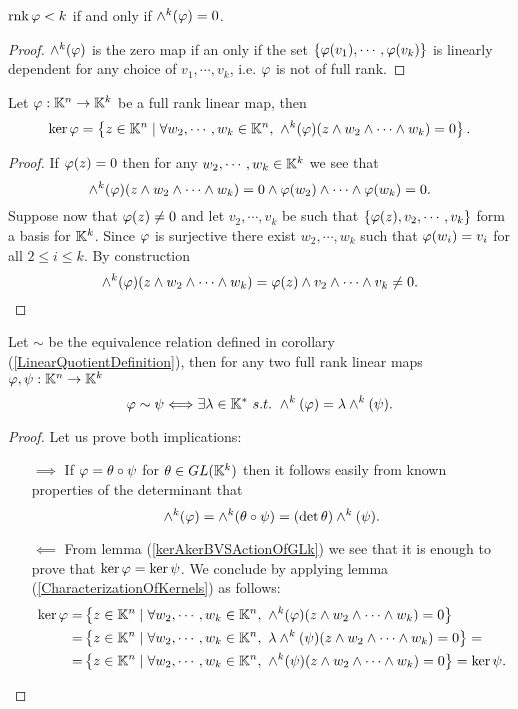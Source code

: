 \begin{remark}\label{WhenPluckerMapIsZero}
$\mathrm{rnk}\, \varphi<k$ if and only if $\wedge^k(\varphi)=0$.
\end{remark}
\begin{proof}
$\wedge^k(\varphi)$ is the zero map if an only if the set $\left\{{\varphi(v_1),\cdots, \varphi(v_k)}\right\}$ is linearly dependent for any choice of $v_1,\cdots, v_k$, i.e. $\varphi$ is not of full rank.
\end{proof}

\begin{lemma}\label{CharacterizationOfKernels}
Let $\varphi:\mathbb{K}^n\to \mathbb{K}^k$ be a full rank linear map, then
\[\ker\varphi=\left\{{z\in\mathbb{K}^n\mid \forall w_2,\cdots, w_k\in \mathbb{K}^n,\ \wedge^k(\varphi)(z\wedge w_2\wedge\cdots\wedge w_k)=0}\right\}.\]
\end{lemma}
\begin{proof}
If $\varphi(z)=0$ then for any $w_2,\cdots, w_k\in \mathbb{K}^k$ we see that 
\[\wedge^k(\varphi)(z\wedge w_2\wedge\cdots\wedge w_k)=0\wedge \varphi(w_2)\wedge\cdots\wedge \varphi(w_k)=0.\]
Suppose now that $\varphi(z)\neq 0$ and let $v_2,\cdots, v_k$ be such that $\left\{{\varphi(z), v_2,\cdots,v_k}\right\}$ form a basis for $\mathbb{K}^k$. Since $\varphi$ is surjective there exist $w_2,\cdots, w_k$ such that $\varphi(w_i)=v_i$ for all $2\leq i\leq k$.
By construction 
\[\wedge^k(\varphi)(z\wedge w_2\wedge\cdots\wedge w_k)=\varphi(z)\wedge v_2\wedge\cdots\wedge v_k\neq0.\]
\end{proof}

\begin{proposition}\label{PluckerMapInjectiveOnGrassmanniansUpToScalar}
Let $\sim$ be the equivalence relation defined in corollary (\ref{LinearQuotientDefinition}), then for any two full rank linear maps $\varphi,\psi:\mathbb{K}^n\to \mathbb{K}^k$
\[\vp\sim \psi\coimplies \exists \la\in\K^\ast\ s.t.\ \wedge^k(\vp)=\la\wedge^k(\psi).\]
\end{proposition}
\begin{proof}
Let us prove both implications:
\setlength{\leftmargini}{0cm}
\begin{itemize}
\item[$\boxed{\implies}$] If $\varphi=\theta\circ \psi$ for $\theta\in GL(\mathbb{K}^k)$ then it follows easily from known properties of the determinant that \[\wedge^k(\varphi)=\wedge^k(\theta\circ \psi)=(\det\theta) \wedge^k(\psi).\]
\item[$\boxed{\impliedby}$] From lemma (\ref{kerAkerBVSActionOfGLk}) we see that it is enough to prove that $\ker \varphi=\ker \psi$. We conclude by applying lemma (\ref{CharacterizationOfKernels}) as follows:
\begin{align*}
\ker\vp=&\cpa{z\in\K^n\mid \forall w_2,\cdots, w_k\in \K^n,\ \wedge^k(\vp)(z\wedge w_2\wedge \cdots\wedge w_k)=0}\\
=&\cpa{z\in\K^n\mid \forall w_2,\cdots, w_k\in \K^n,\ \la\wedge^k(\psi)(z\wedge w_2\wedge\cdots\wedge w_k)=0}=\\
=&\cpa{z\in\K^n\mid \forall w_2,\cdots, w_k\in \K^n,\ \wedge^k(\psi)(z\wedge w_2\wedge \cdots\wedge w_k)=0}=\ker \psi.
\end{align*}
\end{itemize}
\setlength{\leftmargini}{0.5cm}
\end{proof}

